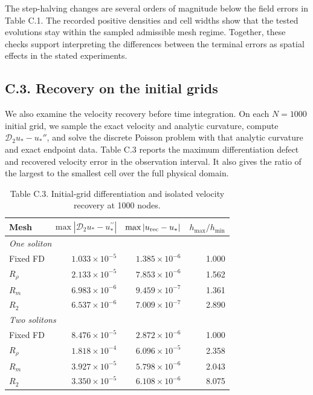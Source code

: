 \documentclass[11pt,a4paper]{article}
\begin{document}
The step-halving changes are several orders of magnitude below the field errors in Table C.1. The recorded positive densities and cell widths show that the tested evolutions stay within the sampled admissible mesh regime. Together, these checks support interpreting the differences between the terminal errors as spatial effects in the stated experiments.

\subsection*{C.3. Recovery on the initial grids}
\label{app:recovery}

We also examine the velocity recovery before time integration. On each \(N=1000\) initial grid, we sample the exact velocity and analytic curvature, compute \(\mathcal D_2u_*-u_*''\), and solve the discrete Poisson problem with that analytic curvature and exact endpoint data. Table C.3 reports the maximum differentiation defect and recovered velocity error in the observation interval. It also gives the ratio of the largest to the smallest cell over the full physical domain.

\begin{table}[!htbp]
\centering
\caption*{Table C.3. Initial-grid differentiation and isolated velocity recovery at 1000 nodes.}
\footnotesize\setlength{\tabcolsep}{3pt}\renewcommand{\arraystretch}{1.18}
\begin{tabular}{lrrr}
\toprule
Mesh & $\max|\mathcal D_2u_*-u_*^{\prime\prime}|$ & $\max|u_{\rm rec}-u_*|$ & $h_{\max}/h_{\min}$ \\
\midrule
\multicolumn{4}{l}{\textit{One soliton}} \\
Fixed FD & $1.033\times10^{-5}$ & $1.385\times10^{-6}$ & 1.000 \\
$R_\rho$ & $2.133\times10^{-5}$ & $7.853\times10^{-6}$ & 1.562 \\
$R_m$ & $6.983\times10^{-6}$ & $9.459\times10^{-7}$ & 1.361 \\
$R_2$ & $6.537\times10^{-6}$ & $7.009\times10^{-7}$ & 2.890 \\
\midrule
\multicolumn{4}{l}{\textit{Two solitons}} \\
Fixed FD & $8.476\times10^{-5}$ & $2.872\times10^{-6}$ & 1.000 \\
$R_\rho$ & $1.818\times10^{-4}$ & $6.096\times10^{-5}$ & 2.358 \\
$R_m$ & $3.927\times10^{-5}$ & $5.798\times10^{-6}$ & 2.043 \\
$R_2$ & $3.350\times10^{-5}$ & $6.108\times10^{-6}$ & 8.075 \\

\bottomrule
\end{tabular}
\end{table}
\FloatBarrier
\end{document}
